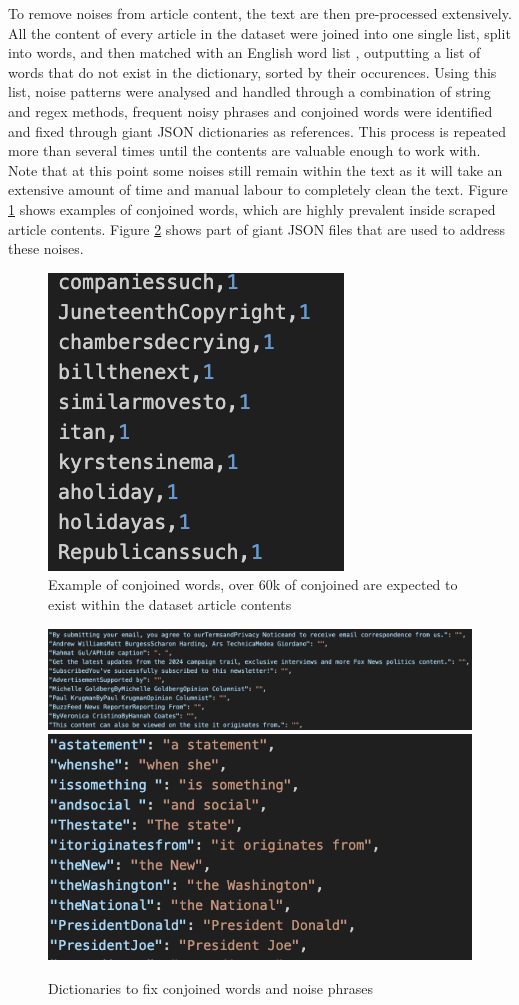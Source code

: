To remove noises from article content, the text are then pre-processed extensively. All the content of every article in the dataset were joined into one single list, split into words, and then matched with an English word list \cite{dwyl-english-words}, outputting a list of words that do not exist in the dictionary, sorted by their occurences. Using this list, noise patterns were analysed and handled through a combination of string and regex methods, frequent noisy phrases and conjoined words were identified and fixed through giant JSON dictionaries as references. This process is repeated more than several times until the contents are valuable enough to work with. Note that at this point some noises still remain within the text as it will take an extensive amount of time and manual labour to completely clean the text. Figure \ref{fig:conjoined_words} shows examples of conjoined words, which are highly prevalent inside scraped article contents. Figure \ref{fig:dict_fix_examples} shows part of giant JSON files that are used to address these noises.


\begin{figure}[htbp]
    \centering
    \includegraphics[width=0.4\linewidth]{images/conjoined_words_example.png}
    \caption{Example of conjoined words, over 60k of conjoined are expected to exist within the dataset article contents}
    \label{fig:conjoined_words}
\end{figure}

\begin{figure}[htbp]
    \centering
    \includegraphics[width=0.67\linewidth]{images/noise_phrases_example.png}
    \includegraphics[width=0.3\linewidth]{images/word_fix_example.png}
    \caption{Dictionaries to fix conjoined words and noise phrases}
    \label{fig:dict_fix_examples}
\end{figure}



